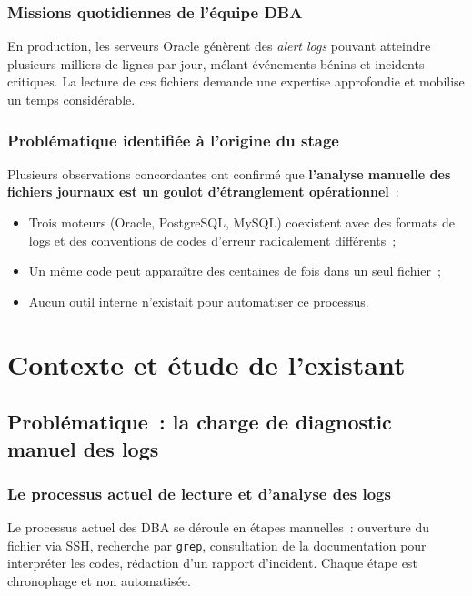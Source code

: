 \documentclass[12pt,a4paper]{report}
\begin{document}
\subsection{Missions quotidiennes de l'\'equipe DBA}

En production, les serveurs Oracle g\'en\`erent des \emph{alert logs} pouvant
atteindre plusieurs milliers de lignes par jour, m\'elant \'ev\'enements b\'enins
et incidents critiques. La lecture de ces fichiers demande une expertise approfondie
et mobilise un temps consid\'erable.

\subsection{Probl\'ematique identifi\'ee \`a l'origine du stage}

Plusieurs observations concordantes ont confirm\'e que \textbf{l'analyse manuelle
des fichiers journaux est un goulot d'\'etranglement op\'erationnel}~:
\begin{itemize}[leftmargin=*]
  \item Trois moteurs (Oracle, PostgreSQL, MySQL) coexistent avec des formats
        de logs et des conventions de codes d'erreur radicalement diff\'erents~;
  \item Un m\^eme code peut appara\^itre des centaines de fois dans un seul fichier~;
  \item Aucun outil interne n'existait pour automatiser ce processus.
\end{itemize}

\chapter{Contexte et \'etude de l'existant}

\section{Probl\'ematique~: la charge de diagnostic manuel des logs}

\subsection{Le processus actuel de lecture et d'analyse des logs}

Le processus actuel des DBA se d\'eroule en \'etapes manuelles~: ouverture du
fichier via SSH, recherche par \texttt{grep}, consultation de la documentation
pour interpr\'eter les codes, r\'edaction d'un rapport d'incident. Chaque \'etape
est chronophage et non automatis\'ee.
\end{document}
